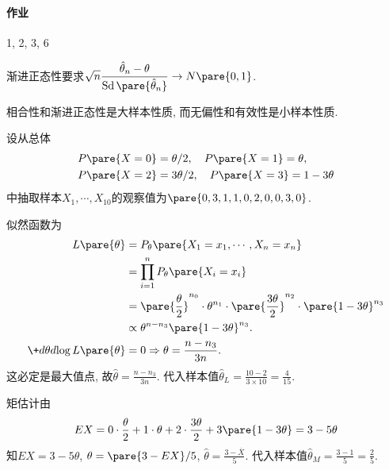 \documentclass{ctexart}
\DeclareMathOperator{\StandardDeviation}{Sd}
\begin{document}
\paragraph{作业} %
\label{par:作业}

1, 2, 3, 6


\begin{remark}
    渐进正态性要求$\displaystyle \sqrt{n}\frac{\hat{\theta}_n - \theta}{\StandardDeviation\pare{\hat\theta_n}}\rightarrow N\pare{0,1}$.
\end{remark}
\begin{remark}
    相合性和渐进正态性是大样本性质, 而无偏性和有效性是小样本性质.
\end{remark}
\begin{sample}
    \begin{ex}
        设从总体
        \begin{align*}
            & P\pare{X=0} = \theta/2,\quad P\pare{X=1} = \theta,\\ & P\pare{X=2} = 3\theta/2,\quad P\pare{X=3} = 1-3\theta
        \end{align*}
        中抽取样本$X_1,\cdots,X_{10}$的观察值为$\pare{0,3,1,1,0,2,0,0,3,0}$.
        \begin{cenum}
            \item 似然函数为
            \begin{align*}
                L\pare{\theta} &= P_\theta\pare{X_1=x_1,\cdots,X_n = x_n} \\
                &= \prod_{i=1}^n P_\theta\pare{X_i = x_i} \\
                &= \pare{\frac{\theta}{2}}^{n_0}\cdot\theta^{n_1}\cdot\pare{\frac{3\theta}{2}}^{n_2}\cdot\pare{1-3\theta}^{n_3} \\
                &\propto \theta^{n-n_3}\pare{1-3\theta}^{n_3}. \\
                \+d{\theta}d{\log L\pare{\theta}} &= 0 \Rightarrow \theta = \frac{n-n_3}{3n}.
            \end{align*}
            这必定是最大值点, 故$\hat\theta = \displaystyle \frac{n-n_3}{3n}$. 代入样本值$\displaystyle \hat\theta_L = \frac{10-2}{3\times 10} = \frac{4}{15}$.
            \item 矩估计由
            \[ EX = 0\cdot \frac{\theta}{2} + 1\cdot \theta + 2\cdot \frac{3\theta}{2} + 3\pare{1-3\theta} = 3-5\theta \]
            知$EX = 3-5\theta$, $\theta = \pare{3-EX}/5$, $\hat\theta = \displaystyle \frac{3-\overbar{X}}{5}$. 代入样本值$\hat{\theta}_M = \displaystyle \frac{3-1}{5} = \frac{2}{5}$.

\end{cenum}
\end{ex}
\end{sample}
\end{document}
